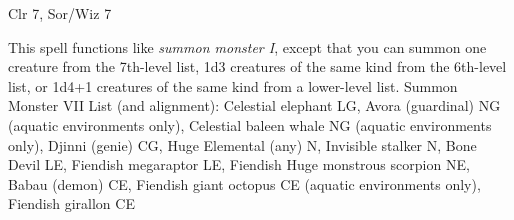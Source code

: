 
\begin{description*}
\item[Level:] Clr 7, Sor/Wiz 7
\end{description*}

This spell functions like \textit{summon monster I}, except that you can summon
one creature from the 7th-level list, 1d3 creatures of the same kind from the 6th-level
list, or 1d4+1 creatures of the same kind from a lower-level list.
Summon Monster VII List (and alignment): Celestial elephant LG, Avora (guardinal) NG (aquatic environments only), Celestial baleen whale NG (aquatic environments only), Djinni (genie) CG, Huge Elemental (any) N, Invisible stalker N, Bone Devil LE, Fiendish megaraptor LE, Fiendish Huge monstrous scorpion NE, Babau (demon) CE, Fiendish giant octopus CE (aquatic environments only), Fiendish girallon CE